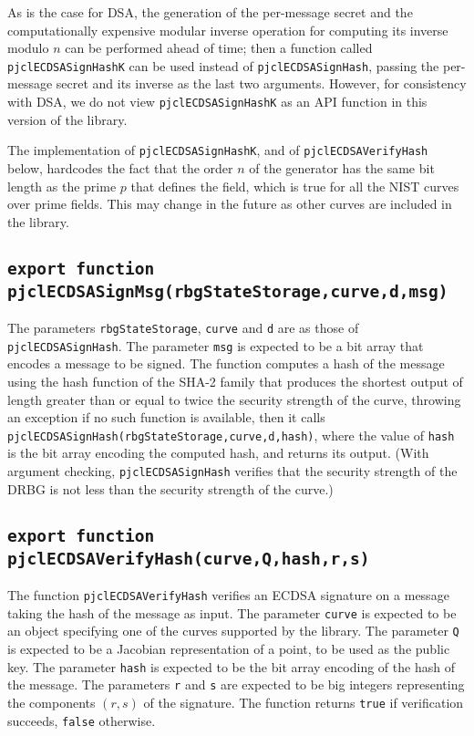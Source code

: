 \documentclass[12pt]{article}
\begin{document}
As is the case for DSA, the generation of the per-message secret and 
the computationally expensive modular inverse operation for computing its inverse modulo $n$
can be performed ahead of time; then a function called
{\tt pjclECDSASignHashK} can be used instead of {\tt pjclECDSASignHash},
passing the per-message secret and its inverse as the last two arguments.
However, for consistency with DSA, we do not view {\tt pjclECDSASignHashK}
as an API function in this version of the library.

The implementation of {\tt pjclECDSASignHashK}, and of {\tt pjclECDSAVerifyHash} below,
hardcodes the fact that the order $n$ of the generator has the same bit length
as the prime $p$ that defines the field, which is true for all the NIST curves over
prime fields.  This may change in the future as other curves are
included in the library.

\subsection{\tt export function pjclECDSASignMsg(rbgStateStorage,curve,d,msg)}

The parameters {\tt rbgStateStorage}, {\tt curve} and {\tt d} are as those of
{\tt pjclECDSASignHash}.
The parameter {\tt msg} is expected to be a bit array that encodes a message
to be signed.  
The function computes a hash of the message using the hash function of the 
SHA-2 family that produces the shortest output of length greater than or equal to twice
the security strength of the curve,
throwing an exception if no such function is available, then it calls
{\tt pjclECDSASignHash(rbgStateStorage,curve,d,hash)}, where the value of {\tt hash}
is the bit array encoding the computed hash, and returns its output.
(With argument checking, {\tt pjclECDSASignHash} verifies that the security strength of the DRBG
is not less than the security strength of the curve.)

\subsection{\tt export function pjclECDSAVerifyHash(curve,Q,hash,r,s)}

The function {\tt pjclECDSAVerifyHash} verifies an ECDSA signature on a message
taking the hash of the message as input.
The parameter {\tt curve} is expected to be an object specifying one of the curves supported by the library.
The parameter {\tt Q} is expected to be a Jacobian representation of a point,
to be used as the public key.
The parameter {\tt hash} is expected to be the bit array encoding of the
hash of the message.
The parameters {\tt r} and {\tt s} are expected to be big integers
representing the components $(r,s)$ of the signature.
The function returns
{\tt true} if verification succeeds, {\tt false} otherwise.
\end{document}
